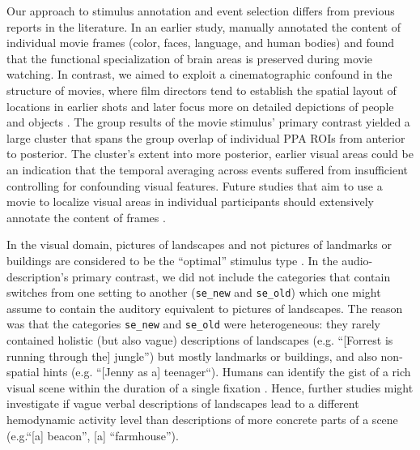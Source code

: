 \documentclass[english]{article}
\begin{document}
Our approach to stimulus annotation and event selection differs from previous
reports in the literature.
In an earlier study, \cite{bartels2004mapping} manually annotated the content of
individual movie frames (color, faces, language, and human bodies) and found
that the functional specialization of brain areas is preserved during movie
watching.
%
In contrast, we aimed to exploit a cinematographic confound in the structure of
movies, where
film directors tend to establish the spatial layout of locations in earlier
shots and later focus more on detailed depictions of people and objects
\citep{brown2012cinematography, katz1991film, mascelli1998five}.
The group results of the movie stimulus' primary contrast yielded a large
cluster that spans the group overlap of individual PPA ROIs from anterior to
posterior.
The cluster's extent into more posterior, earlier visual areas could be an
indication that the temporal averaging across events suffered from insufficient
controlling for confounding visual features.
Future studies that aim to use a movie to localize visual areas in individual
participants should extensively annotate the content of frames \citep[e.g.,
using the open-source solution ``Pliers'' for feature extraction from a visual
naturalistic stimulus;][]{mcnamara2017developing}.

In the visual domain, pictures of landscapes and not pictures of landmarks or
buildings are considered to be the ``optimal'' stimulus type
\citep{epstein2008parahippocampal}.
In the audio-description's primary contrast, we did not include the categories
that contain switches from one setting to another (\texttt{se\_new} and
\texttt{se\_old}) which one might assume to contain the auditory equivalent to
pictures of landscapes.
The reason was that the categories \texttt{se\_new} and \texttt{se\_old} were
heterogeneous: they rarely contained holistic (but also vague) descriptions of
landscapes (e.g.  ``[Forrest is running through the] jungle'') but mostly
landmarks or buildings, and also non-spatial hints (e.g. ``[Jenny as a]
teenager``).
Humans can identify the gist of a rich visual scene within the duration of a
single fixation \citep{henderson2003human}.
%
Hence, further studies might investigate if vague verbal descriptions of
landscapes lead to a different hemodynamic activity level than descriptions of
more concrete parts of a scene (e.g.``[a] beacon'', [a] ``farmhouse'').
\end{document}
